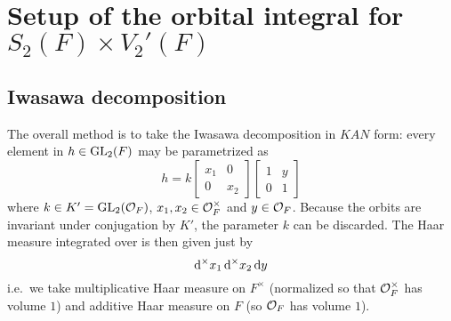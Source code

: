 \section{Setup of the orbital integral for $S_2(F) \times V_2'(F)$}
\subsection{Iwasawa decomposition}
The overall method is to take the Iwasawa decomposition in $KAN$ form:
every element in $h \in \operatorname{GL}_2(F)$ may be parametrized as
\[ h = k \begin{bmatrix} x_1 & 0 \\ 0 & x_2 \end{bmatrix}
  \begin{bmatrix} 1 & y \\ 0 & 1 \end{bmatrix} \]
where $k \in K' = \operatorname{GL}_2(\mathcal O_F)$, $x_1, x_2 \in \mathcal O_F^\times$ and $y \in \mathcal O_F$.
Because the orbits are invariant under conjugation by $K'$,
the parameter $k$ can be discarded.
The Haar measure integrated over is then given just by
\[ \odif[\times] x_1 \odif[\times] x_2 \odif y \]
i.e.\ we take multiplicative Haar measure on $F^\times$
(normalized so that $\mathcal O_F^\times$ has volume $1$)
and additive Haar measure on $F$
(so $\mathcal O_F$ has volume $1$).

